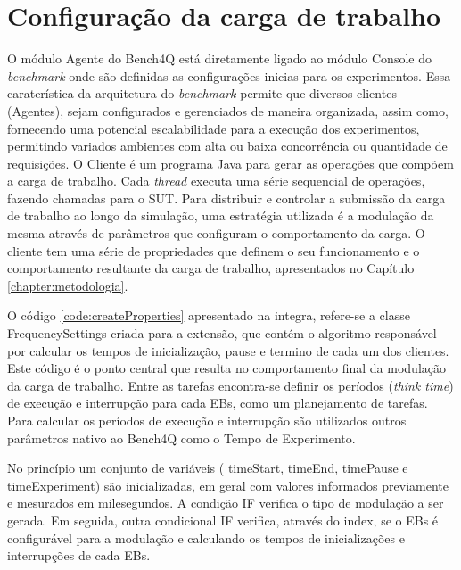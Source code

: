 \section{Configuração da carga de trabalho}
O módulo Agente do Bench4Q está diretamente ligado ao módulo Console do \textit{benchmark} onde são definidas as configurações inicias para os experimentos. Essa caraterística da arquitetura do \textit{benchmark} permite que diversos clientes (Agentes), sejam configurados e gerenciados de maneira organizada, assim como, fornecendo uma potencial escalabilidade para a execução dos experimentos, permitindo variados ambientes com alta ou baixa concorrência ou quantidade de requisições.
O Cliente é um programa Java para gerar as operações que compõem a carga de trabalho. Cada \textit{thread} executa uma série sequencial de operações, fazendo chamadas para o SUT. Para distribuir e controlar a submissão da carga de trabalho ao longo da simulação, uma estratégia utilizada é a modulação da mesma através de parâmetros que configuram o comportamento da carga. O cliente tem uma série de propriedades que definem o seu funcionamento e o comportamento resultante da carga de trabalho, apresentados no Capítulo \ref{chapter:metodologia}. 

O código \ref{code:createProperties} apresentado na integra, refere-se a classe \textsf{FrequencySettings} criada para a extensão, que contém o algoritmo responsável por calcular os tempos de inicialização, pause e termino de cada um dos clientes. Este código é o ponto central que resulta no comportamento final da modulação da carga de trabalho. Entre as tarefas encontra-se  definir os períodos (\textit{think time}) de execução e interrupção para cada EBs, como um planejamento de tarefas. Para calcular os períodos de execução e interrupção são utilizados outros parâmetros nativo ao Bench4Q como o Tempo de Experimento.

No princípio um conjunto de variáveis ( \textsf{timeStart}, \textsf{timeEnd}, \textsf{timePause} e \textsf{timeExperiment}) são inicializadas, em geral com valores informados previamente e mesurados em milesegundos. A condição IF verifica o tipo de modulação a ser gerada. Em seguida, outra condicional IF verifica, através do index, se o EBs é configurável para a modulação e calculando os tempos de inicializações e interrupções de cada EBs.

